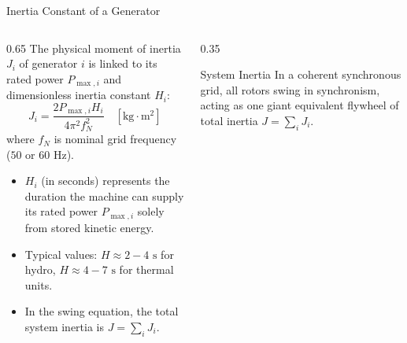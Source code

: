 \begin{frame}{Inertia Constant of a Generator}
\begin{columns}[T]
\begin{column}{0.65\textwidth}
    \footnotesize
    The physical moment of inertia $J_i$ of generator $i$ is linked to its rated power $P_{\max,i}$ and dimensionless inertia constant $H_i$:
    \begin{equation*}
        J_i = \frac{2 P_{\max,i} H_i}{4 \pi^2 f_N^2} \quad [\text{kg}\cdot\text{m}^2]
    \end{equation*}
    where $f_N$ is nominal grid frequency ($50$ or $60\text{ Hz}$).
    \begin{itemize}\setlength{\itemsep}{2pt}
        \item $H_i$ (in seconds) represents the duration the machine can supply its rated power $P_{\max,i}$ solely from stored kinetic energy.
        \item Typical values: $H \approx 2 - 4\text{ s}$ for hydro, $H \approx 4 - 7\text{ s}$ for thermal units.
        \item In the swing equation, the total system inertia is $J = \sum_i J_i$.
    \end{itemize}
\end{column}
\begin{column}{0.35\textwidth}
    \begin{block}{System Inertia}
    \scriptsize
    In a coherent synchronous grid, all rotors swing in synchronism, acting as one giant equivalent flywheel of total inertia $J = \sum_i J_i$.
    \end{block}
\end{column}
\end{columns}
\end{frame}

